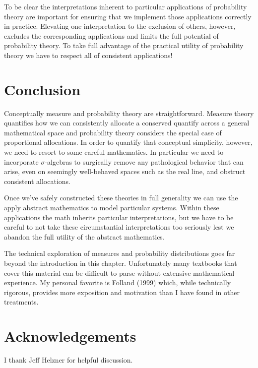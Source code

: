 \documentclass[
  letterpaper,
  DIV=11,
  numbers=noendperiod]{scrartcl}
\begin{document}
To be clear the interpretations inherent to particular applications of
probability theory are important for ensuring that we implement those
applications correctly in practice. Elevating one interpretation to the
exclusion of others, however, excludes the corresponding applications
and limits the full potential of probability theory. To take full
advantage of the practical utility of probability theory we have to
respect all of consistent applications!

\hypertarget{conclusion}{%
\section{Conclusion}\label{conclusion}}

Conceptually measure and probability theory are straightforward. Measure
theory quantifies how we can consistently allocate a conserved quantify
across a general mathematical space and probability theory considers the
special case of proportional allocations. In order to quantify that
conceptual simplicity, however, we need to resort to some careful
mathematics. In particular we need to incorporate \(\sigma\)-algebras to
surgically remove any pathological behavior that can arise, even on
seemingly well-behaved spaces such as the real line, and obstruct
consistent allocations.

Once we've safely constructed these theories in full generality we can
use the apply abstract mathematics to model particular systems. Within
these applications the math inherits particular interpretations, but we
have to be careful to not take these circumstantial interpretations too
seriously lest we abandon the full utility of the abstract mathematics.

The technical exploration of measures and probability distributions goes
far beyond the introduction in this chapter. Unfortunately many
textbooks that cover this material can be difficult to parse without
extensive mathematical experience. My personal favorite is Folland
(1999) which, while technically rigorous, provides more exposition and
motivation than I have found in other treatments.

\hypertarget{acknowledgements}{%
\section{Acknowledgements}\label{acknowledgements}}

I thank Jeff Helzner for helpful discussion.
\end{document}
